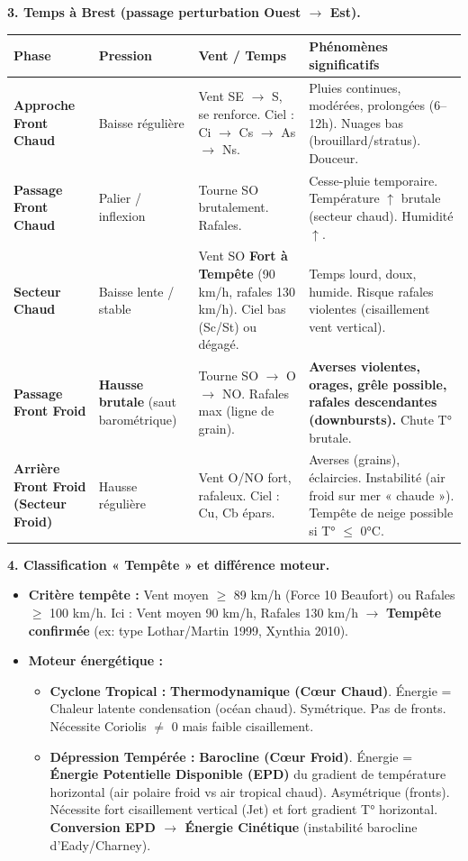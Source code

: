 \documentclass[11pt]{article}
\begin{document}
\begin{exoresolu}
\textbf{3. Temps à Brest (passage perturbation Ouest $\to$ Est).}
\begin{center}
\begin{tabularx}{\linewidth}{|l|X|X|X|}\hline
\textbf{Phase} & \textbf{Pression} & \textbf{Vent / Temps} & \textbf{Phénomènes significatifs} \\ \hline
\textbf{Approche Front Chaud} & Baisse régulière & Vent SE $\to$ S, se renforce. Ciel : Ci $\to$ Cs $\to$ As $\to$ Ns. & Pluies continues, modérées, prolongées (6--12h). Nuages bas (brouillard/stratus). Douceur. \\ \hline
\textbf{Passage Front Chaud} & Palier / inflexion & Tourne SO brutalement. Rafales. & Cesse-pluie temporaire. Température $\uparrow$ brutale (secteur chaud). Humidité $\uparrow$. \\ \hline
\textbf{Secteur Chaud} & Baisse lente / stable & Vent SO \textbf{Fort à Tempête} (90 km/h, rafales 130 km/h). Ciel bas (Sc/St) ou dégagé. & Temps lourd, doux, humide. Risque rafales violentes (cisaillement vent vertical). \\ \hline
\textbf{Passage Front Froid} & \textbf{Hausse brutale} (saut barométrique) & Tourne SO $\to$ O $\to$ NO. Rafales max (ligne de grain). & \textbf{Averses violentes, orages, grêle possible, rafales descendantes (downbursts).} Chute T° brutale. \\ \hline
\textbf{Arrière Front Froid (Secteur Froid)} & Hausse régulière & Vent O/NO fort, rafaleux. Ciel : Cu, Cb épars. & Averses (grains), éclaircies. Instabilité (air froid sur mer « chaude »). Tempête de neige possible si T° $\le$ 0°C. \\ \hline
\end{tabularx}
\end{center}

\textbf{4. Classification « Tempête » et différence moteur.}
\begin{itemize}
    \item \textbf{Critère tempête :} Vent moyen $\ge$ 89 km/h (Force 10 Beaufort) ou Rafales $\ge$ 100 km/h. Ici : Vent moyen 90 km/h, Rafales 130 km/h $\to$ \textbf{Tempête confirmée} (ex: type Lothar/Martin 1999, Xynthia 2010).
    \item \textbf{Moteur énergétique :}
    \begin{itemize}
        \item \textbf{Cyclone Tropical :} \textbf{Thermodynamique (Cœur Chaud)}. Énergie = Chaleur latente condensation (océan chaud). Symétrique. Pas de fronts. Nécessite Coriolis $\neq$ 0 mais faible cisaillement.
        \item \textbf{Dépression Tempérée :} \textbf{Barocline (Cœur Froid)}. Énergie = \textbf{Énergie Potentielle Disponible (EPD)} du gradient de température horizontal (air polaire froid vs air tropical chaud). Asymétrique (fronts). Nécessite fort cisaillement vertical (Jet) et fort gradient T° horizontal. \textbf{Conversion EPD $\to$ Énergie Cinétique} (instabilité barocline d'Eady/Charney).
    \end{itemize}
\end{itemize}


\end{exoresolu}
\end{document}
